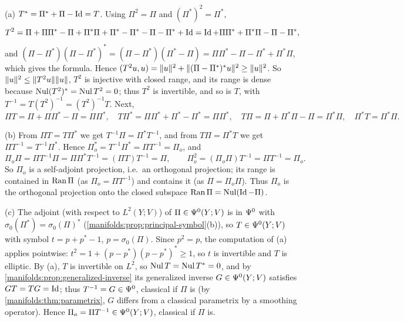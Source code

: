 (a) $T^*=\Pi^*+\Pi-\operatorname{Id}=T$. Using $\Pi^2=\Pi$ and $(\Pi^*)^2=\Pi^*$,
\begin{equation*}
T^2=\Pi+\Pi\Pi^*-\Pi+\Pi^*\Pi+\Pi^*-\Pi^*-\Pi-\Pi^*+\operatorname{Id}=\operatorname{Id}+\Pi\Pi^*+\Pi^*\Pi-\Pi-\Pi^*,
\end{equation*}
and $(\Pi-\Pi^*)(\Pi-\Pi^*)^*=(\Pi-\Pi^*)(\Pi^*-\Pi)=\Pi\Pi^*-\Pi-\Pi^*+\Pi^*\Pi$, which
gives the formula. Hence $( T^2u, u)=\lVert u\rVert^2+\lVert (\Pi-\Pi^*)^*u\rVert^2\ge\lVert u\rVert^2$. So
$\lVert u\rVert^2\le\lVert T^2u\rVert\lVert u\rVert$, $T^2$ is injective with closed range, and its range is
dense because $\operatorname{Nul}(T^2)^*=\operatorname{Nul} T^2=0$; thus $T^2$ is invertible, and so is $T$, with
$T^{-1}=T(T^2)^{-1}=(T^2)^{-1}T$. Next,
\begin{equation*}
\Pi T=\Pi+\Pi\Pi^*-\Pi=\Pi\Pi^*,\quad T\Pi^*=\Pi\Pi^*+\Pi^*-\Pi^*=\Pi\Pi^*,\quad
T\Pi=\Pi+\Pi^*\Pi-\Pi=\Pi^*\Pi,\quad\Pi^*T=\Pi^*\Pi .
\end{equation*}

(b) From $\Pi T=T\Pi^*$ we get $T^{-1}\Pi=\Pi^*T^{-1}$, and from $T\Pi=\Pi^*T$ we get
$\Pi T^{-1}=T^{-1}\Pi^*$. Hence $\Pi_o^*=T^{-1}\Pi^*=\Pi T^{-1}=\Pi_o$, and
\begin{equation*}
\Pi_o\Pi=\Pi T^{-1}\Pi=\Pi\Pi^*T^{-1}=(\Pi T)T^{-1}=\Pi,\qquad
\Pi_o^2=(\Pi_o\Pi)T^{-1}=\Pi T^{-1}=\Pi_o .
\end{equation*}
So $\Pi_o$ is a self-adjoint projection, i.e.\ an orthogonal projection; its range is
contained in $\operatorname{Ran}\Pi$ (as $\Pi_o=\Pi T^{-1}$) and contains it (as $\Pi=\Pi_o\Pi$). Thus
$\Pi_o$ is the orthogonal projection onto the closed subspace $\operatorname{Ran}\Pi=\operatorname{Nul}(\operatorname{Id}-\Pi)$.

(c) The adjoint (with respect to $L^2(Y;V)$) of $\Pi\in\Psi^{0}(Y;V)$ is in $\Psi^{0}$ with
$\sigma_0(\Pi^*)=\sigma_0(\Pi)^*$ (\cref{manifolds:prop:principal-symbol}(b)), so $T\in
\Psi^{0}(Y;V)$ with symbol $t=p+p^*-1$, $p=\sigma_0(\Pi)$. Since $p^2=p$, the computation of
(a) applies pointwise: $t^2=1+(p-p^*)(p-p^*)^*\ge1$, so $t$ is invertible and $T$ is
elliptic. By (a), $T$ is invertible on $L^2$, so $\operatorname{Nul} T=\operatorname{Nul} T^*=0$, and by
\cref{manifolds:prop:generalized-inverse} its generalized inverse $G\in\Psi^{0}(Y;V)$
satisfies $GT=TG=\operatorname{Id}$; thus $T^{-1}=G\in\Psi^{0}$, classical if $\Pi$ is (by
\cref{manifolds:thm:parametrix}, $G$ differs from a classical parametrix by a smoothing
operator). Hence $\Pi_o=\Pi T^{-1}\in\Psi^{0}(Y;V)$, classical if $\Pi$ is.

